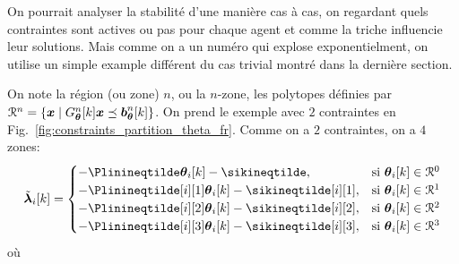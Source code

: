 \documentclass[../main.tex]{subfiles}
\begin{document}
On pourrait analyser la stabilité d'une manière cas à cas, on regardant quels contraintes sont actives ou pas pour chaque agent et comme la triche influencie leur solutions.
Mais comme on a un numéro qui explose exponentielment, on utilise un simple example différent du cas trivial montré dans la dernière section.

On note la région (ou zone) $n$, ou la $n$-zone, les polytopes définies par ${\mathcal{R}^{n}=\{\boldsymbol{x}\mid G_{\boldsymbol{\theta}}^{n}[k]\boldsymbol{x} \preceq \boldsymbol{b}_{\boldsymbol{\theta}}^{n}[k]\}}$.
On prend le exemple avec $2$ contraintes en Fig.~\ref{fig:constraints_partition_theta_fr}.
Comme on a $2$ contraintes, on a $4$ zones:
\begin{equation}
  \lambdaicheat[k]=
  \begin{cases}
    -\Plinineqtilde      \thetaik-\sikineqtilde      ,&\text{si }\thetaik\in\set{R}^{0}\\
    -\Plinineqtilde[i][1]\thetaik-\sikineqtilde[i][1],&\text{si }\thetaik\in\set{R}^{1}\\
    -\Plinineqtilde[i][2]\thetaik-\sikineqtilde[i][2],&\text{si }\thetaik\in\set{R}^{2}\\
    -\Plinineqtilde[i][3]\thetaik-\sikineqtilde[i][3],&\text{si }\thetaik\in\set{R}^{3}\\
  \end{cases}\label{eq:1}
\end{equation}
où
\end{document}
